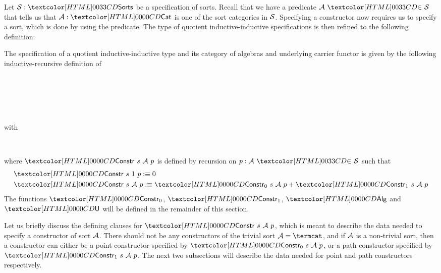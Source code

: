 Let $\Ss : \sortsty$ be a specification of sorts. Recall that we have a
predicate $\sortsin{\Aa}{\Ss}$ that tells us that $\Aa : \Cat$ is one of the
sort categories in $\mathcal{S}$. Specifying a constructor now requires us to
specify a sort, which is done by using the predicate. The type of
quotient inductive-inductive specifications is then refined to the
following definition:

\begin{definition}
The specification of a quotient inductive-inductive type and its
category of algebras and underlying carrier functor is given by the
following inductive-recursive definition of
\begin{sorts}
  \sortnamety{\specty}{\Set} \\
   \\
  \functy{\Alg}{\specty \to \Cat} \\
   \\
\end{sorts}
% 
with
%
\begin{datatype}{\specty}{}
  \constr{\specnil}{\specty} \\
\end{datatype}
%
where $\Constr\ s\ \Aa\ p$ is defined by recursion on $p : \sortsin{\Aa}{\Ss}$ such that
\begin{align*}
&\Constr\ s\ 1\ p \ddefeq 0 \\
&\Constr\ s\ \Aa\ p \ddefeq \Constr_0\ s\ \Aa\ p + \Constr_1\ s\ \Aa\ p
\end{align*}
%
The functions $\Constr_0$, $\Constr_1$, $\Alg$ and $\Und$ will be
defined in the remainder of this section.
\end{definition}

Let us briefly discuss the defining clauses for $\Constr\ s\ \Aa\ p$,
which is meant to describe the data needed to specify a constructor of
sort $\mathcal{A}$. There should not be any constructors of the trivial sort
$\Aa = \termcat$, and if $\mathcal{A}$ is a non-trivial sort, then a
constructor can either be a point constructor specified by
$\Constr_0\ s\ \Aa\ p$, or a path constructor specified by
$\Constr_1\ s\ \Aa\ p$. The next two subsections will describe the
data needed for point and path constructors respectively.

